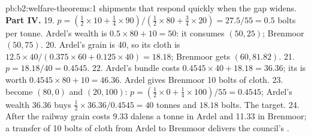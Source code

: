 \begin{solution}{pb:b2:welfare-theorems:1}
shipments that respond quickly when the gap widens.
\textbf{Part IV.}
19. $p = (\tfrac12 \times 10 + \tfrac14 \times 90)/(\tfrac12 \times 80 + \tfrac34 \times 20) = 27.5/55 = 0.5$
bolts per tonne. Ardel's wealth is $0.5 \times 80 + 10 = 50$: it consumes $(50, 25)$; Brenmoor $(50, 75)$.
20. Ardel's grain is 40, so its cloth is $12.5 \times 40/(0.375 \times 60 + 0.125 \times 40) = 18.18$;
Brenmoor gets $(60, 81.82)$.
21. $p = 18.18/40 = 0.4545$.
22. Ardel's bundle costs $0.4545 \times 40 + 18.18 = 36.36$; its  is worth $0.4545 \times 80 + 10 =
46.36$. Ardel gives Brenmoor 10 bolts of cloth.
23.  become $(80, 0)$ and $(20, 100)$: $p = (\tfrac12 \times 0 + \tfrac14 \times 100)/55 = 0.4545$;
Ardel's wealth $36.36$ buys $\tfrac12 \times 36.36/0.4545 = 40$ tonnes and $18.18$ bolts. The target.
24. After the railway grain costs 9.33 dalens a tonne in Ardel and 11.33 in Brenmoor; a transfer of 10 bolts
of cloth from Ardel to Brenmoor delivers the council's .
\end{solution}
